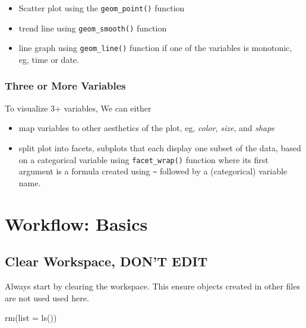 \documentclass[
  letterpaper,
  DIV=11,
  numbers=noendperiod]{scrreprt}
\newenvironment{Shaded}{\begin{snugshade}}{\end{snugshade}}
\newcommand{\AttributeTok}[1]{\textcolor[rgb]{0.40,0.45,0.13}{#1}}
\newcommand{\FunctionTok}[1]{\textcolor[rgb]{0.28,0.35,0.67}{#1}}
\newcommand{\NormalTok}[1]{\textcolor[rgb]{0.00,0.23,0.31}{#1}}
\providecommand{\tightlist}{%
  \setlength{\itemsep}{0pt}\setlength{\parskip}{0pt}}\usepackage{longtable,booktabs,array}
\begin{document}
\begin{itemize}
\tightlist
\item
  Scatter plot using the \texttt{geom\_point()} function
\item
  trend line using \texttt{geom\_smooth()} function
\item
  line graph using \texttt{geom\_line()} function if one of the
  variables is monotonic, eg, time or date.
\end{itemize}

\subsection{Three or More Variables}\label{three-or-more-variables}

To visualize 3+ variables, We can either

\begin{itemize}
\tightlist
\item
  map variables to other aesthetics of the plot, eg, \emph{color},
  \emph{size}, and \emph{shape}
\item
  split plot into facets, subplots that each display one subset of the
  data, based on a categorical variable using \texttt{facet\_wrap()}
  function where its first argument is a formula created using
  \texttt{\textasciitilde{}} followed by a (categorical) variable name.
\end{itemize}

\chapter{Workflow: Basics}\label{workflow-basics}

\section*{Clear Workspace, DON'T
EDIT}\label{clear-workspace-dont-edit-4}


Always start by clearing the workspace. This ensure objects created in
other files are not used used here.

\begin{Shaded}
\begin{Highlighting}[]
\FunctionTok{rm}\NormalTok{(}\AttributeTok{list =} \FunctionTok{ls}\NormalTok{())}
\end{Highlighting}
\end{Shaded}
\end{document}
